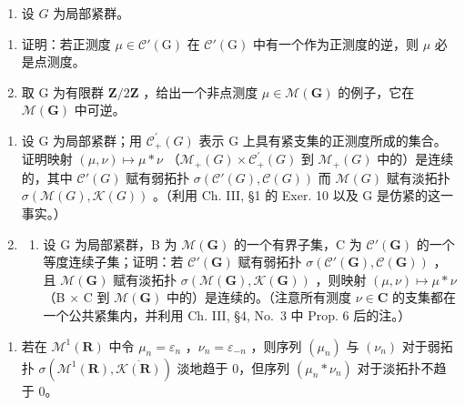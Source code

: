 \begin{enumerate}
\def\labelenumi{\arabic{enumi})}
\setcounter{enumi}{6}
\tightlist
\item
  设 \(G\) 为局部紧群。
\end{enumerate}

\begin{enumerate}
\def\labelenumi{\alph{enumi})}
\item
  证明：若正测度 \(\mu \in \mathcal{C}'(\mathrm{G})\) 在 \(\mathcal{C}'(\mathrm{G})\) 中有一个作为正测度的逆，则 \(\mu\) 必是点测度。
\item
  取 G 为有限群 \(\mathbf{Z}/2\mathbf{Z}\) ，给出一个非点测度 \(\mu \in \mathcal{M}(\mathbf{G})\) 的例子，它在 \(\mathcal{M}(\mathbf{G})\) 中可逆。
\end{enumerate}

\begin{enumerate}
\def\labelenumi{\arabic{enumi})}
\setcounter{enumi}{7}
\item
  设 G 为局部紧群；用 \(\mathcal{C}_{+}^{\prime}(G)\) 表示 G 上具有紧支集的正测度所成的集合。证明映射 \((\mu, \nu) \mapsto \mu * \nu\) （\(\mathcal{M}_{+}(G) \times \mathcal{C}_{+}^{\prime}(G)\) 到 \(\mathcal{M}_{+}(G)\) 中的）是连续的，其中 \(\mathcal{C}'(G)\) 赋有弱拓扑 \(\sigma(\mathcal{C}'(G), \mathcal{C}(G))\) 而 \(\mathcal{M}(G)\) 赋有淡拓扑 \(\sigma(\mathcal{M}(G), \mathcal{K}(G))\) 。（利用 Ch. III, §1 的 Exer. 10 以及 G 是仿紧的这一事实。）
\item
  \begin{enumerate}
  \def\labelenumii{\alph{enumii})}
  \tightlist
  \item
    设 G 为局部紧群，B 为 \(\mathcal{M}(\mathbf{G})\) 的一个有界子集，C 为 \(\mathcal{C}'(\mathbf{G})\) 的一个等度连续子集；证明：若 \(\mathcal{C}'(\mathbf{G})\) 赋有弱拓扑 \(\sigma(\mathcal{C}'(\mathbf{G}), \mathcal{C}(\mathbf{G}))\) ，且 \(\mathcal{M}(\mathbf{G})\) 赋有淡拓扑 \(\sigma(\mathcal{M}(\mathbf{G}), \mathcal{K}(\mathbf{G}))\) ，则映射 \((\mu, \nu) \mapsto \mu * \nu\) （B × C 到 \(\mathcal{M}(\mathbf{G})\) 中的）是连续的。（注意所有测度 \(\nu \in \mathbf{C}\) 的支集都在一个公共紧集内，并利用 Ch. III, §4, No.~3 中 Prop. 6 后的注。）
  \end{enumerate}
\end{enumerate}

\begin{enumerate}
\def\labelenumi{\alph{enumi})}
\setcounter{enumi}{1}
\tightlist
\item
  若在 \(\mathcal{M}^1 (\mathbf{R})\) 中令 \(\mu_n = \varepsilon_n\) ，\(\nu_{n} = \varepsilon_{-n}\) ，则序列 \((\mu_n)\) 与 \((\nu_{n})\) 对于弱拓扑 \(\sigma (\mathcal{M}^1 (\mathbf{R}),\overline{\mathcal{K}(\mathbf{R})})\) 淡地趋于 0，但序列 \((\mu_n*\nu_n)\) 对于淡拓扑不趋于 0。
\end{enumerate}


